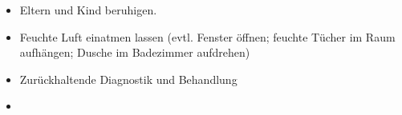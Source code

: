 %
%
\label{m:laryngitis}
\begin{itemize}
    \item Eltern und Kind beruhigen.
    \item Feuchte Luft einatmen lassen (evtl. Fenster
    öffnen; feuchte Tücher im Raum aufhängen; Dusche im Badezimmer aufdrehen)
    \item Zurückhaltende Diagnostik 
    und Behandlung %
    \item {}
\end{itemize}
